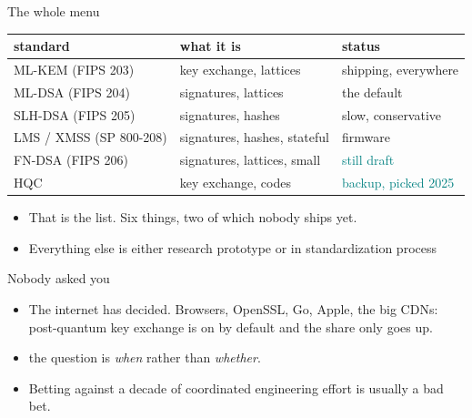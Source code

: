 \documentclass[aspectratio=169]{beamer}
\newcommand{\cgood}[1]{\textcolor{peri}{#1}}
\newcommand{\cwarm}[1]{\textcolor{teal}{#1}}
\begin{document}
          \begin{frame}{The whole menu}
  \centering\footnotesize
  \begin{tabular}{@{}l l l@{}}
    \toprule
    \textbf{standard} & \textbf{what it is} & \textbf{status} \\
    \midrule
    ML-KEM (FIPS 203) & key exchange, lattices & \cgood{shipping, everywhere} \\
    ML-DSA (FIPS 204) & signatures, lattices & \cgood{the default} \\
    SLH-DSA (FIPS 205) & signatures, hashes & \cgood{slow, conservative} \\
    LMS / XMSS (SP 800-208) & signatures, hashes, stateful & \cgood{firmware} \\
    FN-DSA (FIPS 206) & signatures, lattices, small & \cwarm{still draft} \\
    HQC & key exchange, codes & \cwarm{backup, picked 2025} \\
    \bottomrule
  \end{tabular}
  \vspace{3mm}
  \begin{itemize}
    \item<2-> That is the list. Six things, two of which nobody ships
      yet.
    \item<3-> Everything else is either research
      prototype or in standardization process
  \end{itemize}
\end{frame}

\begin{frame}{Nobody asked you}
  \begin{itemize}
    \item<1-> The internet has decided. Browsers, OpenSSL, Go, Apple,
      the big CDNs: post-quantum key exchange is on by default and
      the share only goes up.
    \item<2->  the question is \emph{when} rather than \emph{whether}.
    \item<3-> \alert{Betting against a decade of coordinated
      engineering effort is usually a bad bet.} 
  \end{itemize}
\end{frame}
\end{document}
